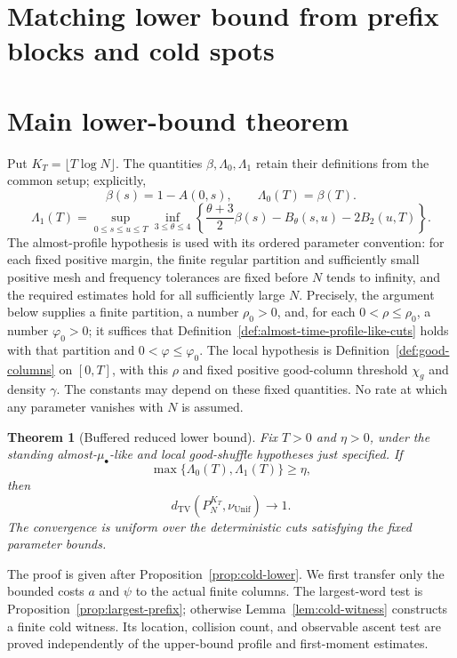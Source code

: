 \documentclass[11pt]{article}
\numberwithin{equation}{section}
\newtheorem{theorem}{Theorem}[section]
\newcommand{\TV}{\mathrm{TV}}
\newcommand{\Unif}{\mathrm{Unif}}
\newcommand{\1}{\mathbf 1}
\newcommand{\nuUnif}{\nu_{\Unif}}
\begin{document}
\clearpage
\section*{Matching lower bound from prefix blocks and cold spots}

\section{Main lower-bound theorem}

Put $K_T=\lfloor T\log N\rfloor$. The quantities $\beta,\Lambda_0,\Lambda_1$
retain their definitions from the common setup; explicitly,
\[
 \beta(s)=1-A(0,s),\qquad \Lambda_0(T)=\beta(T).
\]
\[
 \Lambda_1(T)=\sup_{0\le s\le u\le T}\inf_{3\le\theta\le4}
 \left\{\frac{\theta+3}{2}\beta(s)-B_\theta(s,u)-2B_2(u,T)\right\}.
\]
The almost-profile hypothesis is used with its ordered parameter convention:
for each fixed positive margin, the finite regular partition and sufficiently
small positive mesh and frequency tolerances are fixed before $N$ tends to
infinity, and the required estimates hold for all sufficiently large $N$.
Precisely, the argument below supplies a finite partition, a number $\rho_0>0$,
and, for each $0<\rho\le\rho_0$, a number $\varphi_0>0$; it suffices that
Definition~\ref{def:almost-time-profile-like-cuts} holds with that partition
and $0<\varphi\le\varphi_0$. The local hypothesis is
Definition~\ref{def:good-columns} on $[0,T]$, with this $\rho$ and fixed
positive good-column threshold $\chi_g$ and density $\gamma$.
The constants may depend on these fixed quantities. No rate at which any
parameter vanishes with $N$ is assumed.

\begin{theorem}[Buffered reduced lower bound]
\label{thm:buffered-reduced-lower-bound}
Fix $T>0$ and $\eta>0$, under the standing almost-$\mu_\bullet$-like
and local good-shuffle hypotheses just specified. If
\[
 \max\{\Lambda_0(T),\Lambda_1(T)\}\ge\eta,
\]
then
\[
 d_{\TV}(P_N^{K_T},\nuUnif)\longrightarrow1.
\]
The convergence is uniform over the deterministic cuts satisfying the fixed
parameter bounds.
\end{theorem}

The proof is given after Proposition~\ref{prop:cold-lower}. We first transfer
only the bounded costs $a$ and $\psi$ to the actual finite columns. The
largest-word test is Proposition~\ref{prop:largest-prefix}; otherwise
Lemma~\ref{lem:cold-witness} constructs a finite cold witness. Its location,
collision count, and observable ascent test are proved independently of the
upper-bound profile and first-moment estimates.
\end{document}
